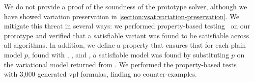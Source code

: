 We do not provide a proof of the soundness of the prototype solver, although we
have showed variation preservation in
\autoref{section:vsat:variation-preservation}. We mitigate this threat in
several ways: we performed property-based testing~\cite{quickcheck} on our
prototype and verified that a satisfiable variant was found to be satisfiable
across all algorithms. In addition, we define a property that ensures that for
each plain model $p$, found with \pTov{}, \vTop{}, and \pTop{}, a satisfiable
model  was found by substituting $p$ on the variational model returned
from \vsat{}. We performed the property-based tests with 3,000 generated
\ac{vpl} formulas, finding no counter-examples.



